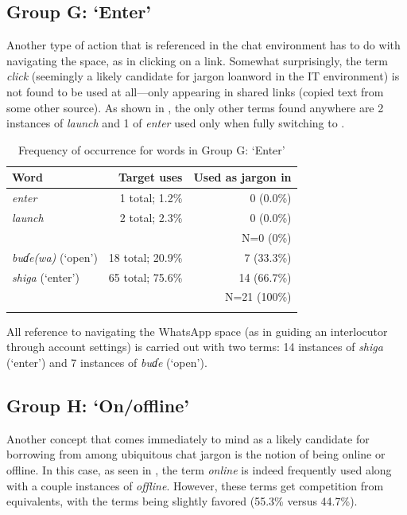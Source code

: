 \documentclass[output=paper
,newtxmath
,modfonts
,nonflat]{langsci/langscibook}
\begin{document}
\subsection{Group G: ‘Enter’}

Another type of action that is referenced in the chat environment has to do with navigating the space, as in clicking on a link. Somewhat surprisingly, the  term \textit{click} (seemingly a likely candidate for jargon loanword in the IT environment) is not found to be used at all—only appearing in shared links (copied text from some other source). As shown in , the only other  terms found anywhere are 2 instances of \textit{launch} and 1 of \textit{enter} used only when fully switching to . 

\begin{table}
\begin{tabularx}{\textwidth}{Qrr}
\lsptoprule
Word & Target uses& Used as jargon in \\
\midrule
\textit{enter}  & 1 total; 1.2\% & 0 (0.0\%)\\
\textit{launch} & 2 total; 2.3\% & 0 (0.0\%)\\\midrule
& & N=0 (0\%)\\\midrule
\textit{buɗe(wa)} (‘open’) & 18 total; 20.9\% & 7 (33.3\%)\\
\textit{shiga} (‘enter’)   & 65 total; 75.6\% & 14 (66.7\%)\\\midrule
& & N=21 (100\%)\\
\lspbottomrule
\end{tabularx}
\caption{Frequency of occurrence for words in Group G: ‘Enter’}
\label{tab:purvis:9}
\end{table} 

All reference to navigating the WhatsApp space (as in guiding an interlocutor through account settings) is carried out with two  terms: 14 instances of \textit{shiga} (‘enter’) and 7 instances of \textit{buɗe} (‘open’).

\subsection{Group H: ‘On/offline’}

Another concept that comes immediately to mind as a likely candidate for borrowing from among ubiquitous  chat jargon is the notion of being online or offline. In this case, as seen in , the  term \textit{online} is indeed frequently used along with a couple instances of \textit{offline}. However, these terms get competition from  equivalents, with the  terms being slightly favored (55.3\% versus 44.7\%).
\end{document}
